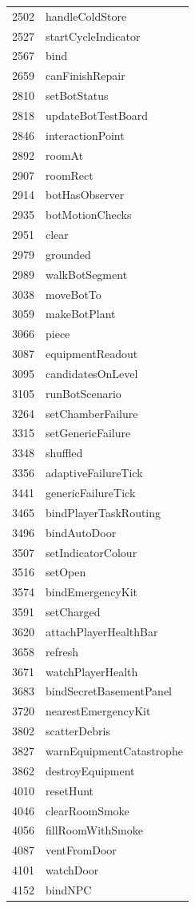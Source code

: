 \begin{longtable}{p{}p{}}
2502 & handleColdStore \\
2527 & startCycleIndicator \\
2567 & bind \\
2659 & canFinishRepair \\
2810 & setBotStatus \\
2818 & updateBotTestBoard \\
2846 & interactionPoint \\
2892 & roomAt \\
2907 & roomRect \\
2914 & botHasObserver \\
2935 & botMotionChecks \\
2951 & clear \\
2979 & grounded \\
2989 & walkBotSegment \\
3038 & moveBotTo \\
3059 & makeBotPlant \\
3066 & piece \\
3087 & equipmentReadout \\
3095 & candidatesOnLevel \\
3105 & runBotScenario \\
3264 & setChamberFailure \\
3315 & setGenericFailure \\
3348 & shuffled \\
3356 & adaptiveFailureTick \\
3441 & genericFailureTick \\
3465 & bindPlayerTaskRouting \\
3496 & bindAutoDoor \\
3507 & setIndicatorColour \\
3516 & setOpen \\
3574 & bindEmergencyKit \\
3591 & setCharged \\
3620 & attachPlayerHealthBar \\
3658 & refresh \\
3671 & watchPlayerHealth \\
3683 & bindSecretBasementPanel \\
3720 & nearestEmergencyKit \\
3802 & scatterDebris \\
3827 & warnEquipmentCatastrophe \\
3862 & destroyEquipment \\
4010 & resetHunt \\
4046 & clearRoomSmoke \\
4056 & fillRoomWithSmoke \\
4087 & ventFromDoor \\
4101 & watchDoor \\
4152 & bindNPC \\
\bottomrule
\end{longtable}

